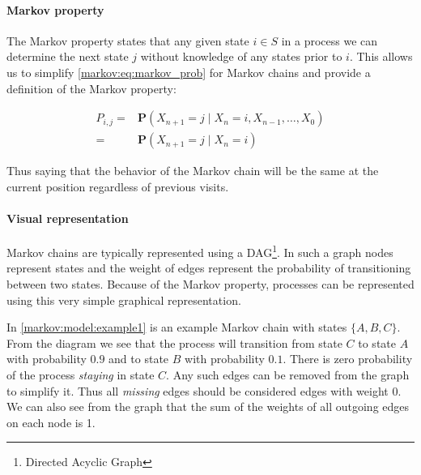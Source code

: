 \paragraph{Markov property}\label{markov:property}
The Markov property states that any given state $i \in S$ in a process we can determine the next state $j$ without knowledge of any states prior to $i$.
This allows us to simplify \cref{markov:eq:markov_prob} for Markov chains and provide a definition of the Markov property:

\begin{align}\label{markov:eq:markov_prob}
P_{i,j} = &\mathbf{P}(X_{n+1} = j \mid X_n = i, X_{n-1}, \dots, X_0) \nonumber\\
        = &\mathbf{P}(X_{n+1} = j \mid X_n = i)
\end{align}

Thus saying that the behavior of the Markov chain will be the same at the current position regardless of previous visits.


\paragraph{Visual representation}
Markov chains are typically represented using a DAG\footnote{Directed Acyclic Graph}.
In such a graph nodes represent states and the weight of edges represent the probability of transitioning between two states.
Because of the Markov property, processes can be represented using this very simple graphical representation.

In \cref{markov:model:example1} is an example Markov chain with states $\{A, B, C\}$.
From the diagram we see that the process will transition from state $C$ to state $A$ with probability $0.9$ and to state $B$ with probability $0.1$.
There is zero probability of the process \textit{staying} in state $C$.
Any such edges can be removed from the graph to simplify it.
Thus all \emph{missing} edges should be considered edges with weight 0.
We can also see from the graph that the sum of the weights of all outgoing edges on each node is 1.


